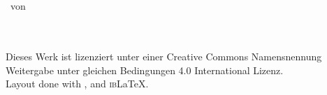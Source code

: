\maketitle

\begin{titlepage}
\centering
{\huge \titel}\bigskip\\  
{\Large \untertitel}\bigskip\\
{\large \thesisname\ von\ \authorname}\bigskip\\
\begin{abstract}
\warn{\blindtext}
\end{abstract}
\par\vfill
\authorname \bigskip\\
\ccbysa\\
Dieses Werk ist lizenziert unter einer Creative Commons Namensnennung\\
Weitergabe unter gleichen Bedingungen 4.0 International Lizenz.\bigskip\\
Layout done with {\rmfamily \LaTeXe}, {\sffamily \KOMAScript} and {\rmfamily \textsc{ib}\LaTeX}.
\end{titlepage}
\clearpage
